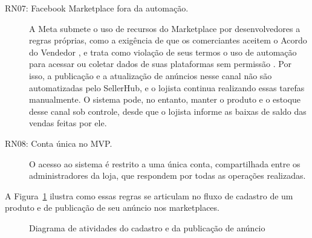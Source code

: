 \begin{description}
\item[RN07: Facebook Marketplace fora da automação.] A Meta submete o uso de recursos do Marketplace por desenvolvedores a regras próprias, como a exigência de que os comerciantes aceitem o Acordo do Vendedor \cite{metadesenvolvedor2026}, e trata como violação de seus termos o uso de automação para acessar ou coletar dados de suas plataformas sem permissão \cite{metaprivacidade}. Por isso, a publicação e a atualização de anúncios nesse canal não são automatizadas pelo SellerHub, e o lojista continua realizando essas tarefas manualmente. O sistema pode, no entanto, manter o produto e o estoque desse canal sob controle, desde que o lojista informe as baixas de saldo das vendas feitas por ele.
\item[RN08: Conta única no MVP.] O acesso ao sistema é restrito a uma única conta, compartilhada entre os administradores da loja, que respondem por todas as operações realizadas.
\end{description}

A Figura~\ref{fig:atividades} ilustra como essas regras se articulam no fluxo de cadastro de um produto e de publicação de seu anúncio nos marketplaces.

\begin{landscape}
\begin{figure}[htbp]
\centering
\caption{Diagrama de atividades do cadastro e da publicação de anúncio}
\label{fig:atividades}
\resizebox{\linewidth}{!}{}
\end{figure}
\end{landscape}